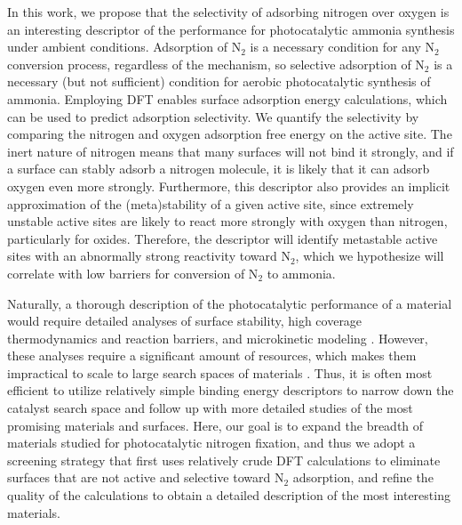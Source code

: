 In this work, we propose that the selectivity of adsorbing nitrogen over oxygen is an interesting descriptor of the performance for photocatalytic ammonia synthesis under ambient conditions. Adsorption of N$_2$ is a necessary condition for any N$_2$ conversion process, regardless of the mechanism, so selective adsorption of N$_2$ is a necessary (but not sufficient) condition for aerobic photocatalytic synthesis of ammonia. Employing DFT enables surface adsorption energy calculations, which can be used to predict adsorption selectivity. We quantify the selectivity by comparing the nitrogen and oxygen adsorption free energy on the active site. The inert nature of nitrogen means that many surfaces will not bind it strongly, and if a surface can stably adsorb a nitrogen molecule, it is likely that it can adsorb oxygen even more strongly. Furthermore, this descriptor also provides an implicit approximation of the (meta)stability of a given active site, since extremely unstable active sites are likely to react more strongly with oxygen than nitrogen, particularly for oxides. Therefore, the descriptor will identify metastable active sites with an abnormally strong reactivity toward N$_2$, which we hypothesize will correlate with low barriers for conversion of N$_2$ to ammonia.

Naturally, a thorough description of the photocatalytic performance of a material would require detailed analyses of surface stability, high coverage thermodynamics and reaction barriers, and microkinetic modeling \cite{Motagamwala2021MicrokineticDesign, Peterson_2010}. However, these analyses require a significant amount of resources, which makes them impractical to scale to large search spaces of materials \cite{Wander2022Catlas:Conversion}. Thus, it is often most efficient to utilize relatively simple binding energy descriptors to narrow down the catalyst search space and follow up with more detailed studies of the most promising materials and surfaces. Here, our goal is to expand the breadth of materials studied for photocatalytic nitrogen fixation, and thus we adopt a screening strategy that first uses relatively crude DFT calculations to eliminate surfaces that are not active and selective toward N$_2$ adsorption, and refine the quality of the calculations to obtain a detailed description of the most interesting materials.


